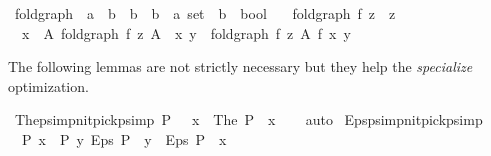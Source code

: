 \begin{isabellebody}
\isanewline
{}\isamarkupfalse%
\ fold{\isacharunderscore}{\kern0pt}graph{\isacharprime}{\kern0pt}\ {\isacharcolon}{\kern0pt}{\isacharcolon}{\kern0pt}\ {\isachardoublequoteopen}{\isacharparenleft}{\kern0pt}{\isacharprime}{\kern0pt}a\ {\isasymRightarrow}\ {\isacharprime}{\kern0pt}b\ {\isasymRightarrow}\ {\isacharprime}{\kern0pt}b{\isacharparenright}{\kern0pt}\ {\isasymRightarrow}\ {\isacharprime}{\kern0pt}b\ {\isasymRightarrow}\ {\isacharprime}{\kern0pt}a\ set\ {\isasymRightarrow}\ {\isacharprime}{\kern0pt}b\ {\isasymRightarrow}\ bool{\isachardoublequoteclose}\ \isanewline
\ \ {\isachardoublequoteopen}fold{\isacharunderscore}{\kern0pt}graph{\isacharprime}{\kern0pt}\ f\ z\ {\isacharbraceleft}{\kern0pt}{\isacharbraceright}{\kern0pt}\ z{\isachardoublequoteclose}\ {\isacharbar}{\kern0pt}\isanewline
\ \ {\isachardoublequoteopen}{\isasymlbrakk}x\ {\isasymin}\ A{\isacharsemicolon}{\kern0pt}\ fold{\isacharunderscore}{\kern0pt}graph{\isacharprime}{\kern0pt}\ f\ z\ {\isacharparenleft}{\kern0pt}A\ {\isacharminus}{\kern0pt}\ {\isacharbraceleft}{\kern0pt}x{\isacharbraceright}{\kern0pt}{\isacharparenright}{\kern0pt}\ y{\isasymrbrakk}\ {\isasymLongrightarrow}\ fold{\isacharunderscore}{\kern0pt}graph{\isacharprime}{\kern0pt}\ f\ z\ A\ {\isacharparenleft}{\kern0pt}f\ x\ y{\isacharparenright}{\kern0pt}{\isachardoublequoteclose}%
\begin{isamarkuptext}%
The following lemmas are not strictly necessary but they help the
\textit{specialize} optimization.%
\end{isamarkuptext}\isamarkuptrue%
\isamarkupfalse%
\ The{\isacharunderscore}{\kern0pt}psimp{\isacharbrackleft}{\kern0pt}nitpick{\isacharunderscore}{\kern0pt}psimp{\isacharbrackright}{\kern0pt}{\isacharcolon}{\kern0pt}\ {\isachardoublequoteopen}P\ {\isacharequal}{\kern0pt}\ {\isacharparenleft}{\kern0pt}{\isacharequal}{\kern0pt}{\isacharparenright}{\kern0pt}\ x\ {\isasymLongrightarrow}\ The\ P\ {\isacharequal}{\kern0pt}\ x{\isachardoublequoteclose}\isanewline
%
\isadelimproof
\ \ %
\endisadelimproof
%
\isatagproof
{}\isamarkupfalse%
\ auto%
\endisatagproof
{\isafoldproof}%
%
\isadelimproof
\isanewline
%
\endisadelimproof
\isanewline
{}\isamarkupfalse%
\ Eps{\isacharunderscore}{\kern0pt}psimp{\isacharbrackleft}{\kern0pt}nitpick{\isacharunderscore}{\kern0pt}psimp{\isacharbrackright}{\kern0pt}{\isacharcolon}{\kern0pt}\isanewline
\ \ {\isachardoublequoteopen}{\isasymlbrakk}P\ x{\isacharsemicolon}{\kern0pt}\ {\isasymnot}\ P\ y{\isacharsemicolon}{\kern0pt}\ Eps\ P\ {\isacharequal}{\kern0pt}\ y{\isasymrbrakk}\ {\isasymLongrightarrow}\ Eps\ P\ {\isacharequal}{\kern0pt}\ x{\isachardoublequoteclose}\isanewline

\end{isabellebody}
